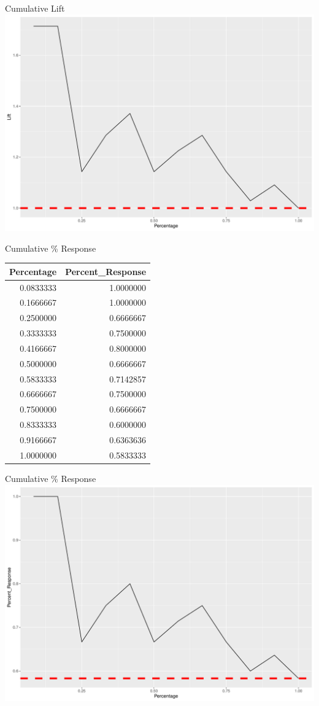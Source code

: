 \documentclass[
  ignorenonframetext,
]{beamer}
\begin{document}
\begin{frame}{Cumulative Lift}
\protect\hypertarget{cumulative-lift-8}{}
\includegraphics{measuring_performance_files/figure-beamer/unnamed-chunk-12-1.pdf}
\end{frame}

\begin{frame}{Cumulative \% Response}
\protect\hypertarget{cumulative-response}{}
\begin{longtable}[]{@{}rr@{}}
\toprule
Percentage & Percent\_Response \\
\midrule
\endhead
0.0833333 & 1.0000000 \\
0.1666667 & 1.0000000 \\
0.2500000 & 0.6666667 \\
0.3333333 & 0.7500000 \\
0.4166667 & 0.8000000 \\
0.5000000 & 0.6666667 \\
0.5833333 & 0.7142857 \\
0.6666667 & 0.7500000 \\
0.7500000 & 0.6666667 \\
0.8333333 & 0.6000000 \\
0.9166667 & 0.6363636 \\
1.0000000 & 0.5833333 \\
\bottomrule
\end{longtable}
\end{frame}

\begin{frame}{Cumulative \% Response}
\protect\hypertarget{cumulative-response-1}{}
\includegraphics{measuring_performance_files/figure-beamer/unnamed-chunk-14-1.pdf}
\end{frame}
\end{document}
